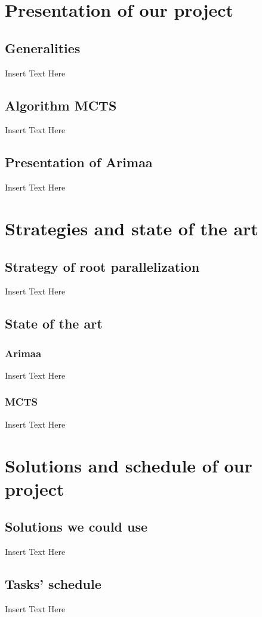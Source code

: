\documentclass[12pt]{article}
\begin{document}
\section{Presentation of our project}
\subsection{Generalities}
Insert Text Here
\subsection{Algorithm MCTS}
Insert Text Here
\subsection{Presentation of Arimaa} 
Insert Text Here

\newpage
\section{Strategies and state of the art}
\subsection{Strategy of root parallelization}
Insert Text Here
\subsection{State of the art}
\subsubsection{Arimaa}
Insert Text Here
\subsubsection{MCTS}
Insert Text Here

\newpage
\section{Solutions and schedule of our project}
\subsection{Solutions we could use}
Insert Text Here
\subsection {Tasks' schedule}
Insert Text Here
\newpage
\end{document}
